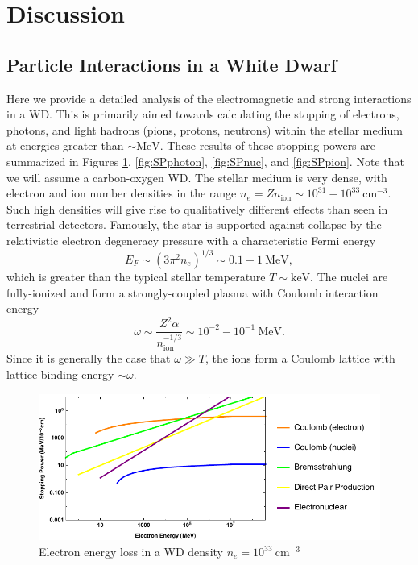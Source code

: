 \documentclass[twocolumn,showpacs,preprintnumbers,amsmath,amssymb,prd]{revtex4}
\newcommand{\MeV}{\text{MeV}}
\newcommand{\keV}{\text{keV}}
\newcommand{\cm}{\text{cm}}
\begin{document}
\section{Discussion}
\label{sec:Discussion}

\begin{appendices}

\section{Particle Interactions in a White Dwarf}
\label{sec:Appendix}
Here we provide a detailed analysis of the electromagnetic and strong interactions in a WD.
This is primarily aimed towards calculating the stopping of electrons, photons, and light hadrons (pions, protons, neutrons) within the stellar medium at energies greater than $\sim \text{MeV}$. 
These results of these stopping powers are summarized in Figures \ref{fig:SPelectron}, \ref{fig:SPphoton}, \ref{fig:SPnuc}, and \ref{fig:SPpion}.
Note that we will assume a carbon-oxygen WD.
The stellar medium is very dense, with electron and ion number densities in the range $n_e = Z n_\text{ion} \sim 10^{31} - 10^{33} ~\cm^{-3}$.  
Such high densities will give rise to qualitatively different effects than seen in terrestrial detectors. 
Famously, the star is supported against collapse by the relativistic electron degeneracy pressure with a characteristic Fermi energy
\begin{equation}
  E_F \sim (3 \pi^2 n_e)^{1/3} \sim 0.1 - 1 ~\MeV,
\end{equation}
which is greater than the typical stellar temperature $T \sim \keV$. 
The nuclei are fully-ionized and form a strongly-coupled plasma with Coulomb interaction energy
\begin{equation}
\label{eq:lattice}
  \omega \sim \frac{Z^2 \alpha}{n_\text{ion}^{-1/3}} 
         \sim 10^{-2} - 10^{-1} ~\MeV.
\end{equation}
Since it is generally the case that $\omega \gg T$, the ions form a Coulomb lattice with lattice binding energy $\sim \omega$. 
\begin{figure}
\includegraphics[scale=.60]{SPelectron.pdf}
\caption{Electron energy loss in a WD density $n_e = 10^{33} ~\text{cm}^{-3}$}
\label{fig:SPelectron}
\end{figure}


\end{appendices}
\end{document}
